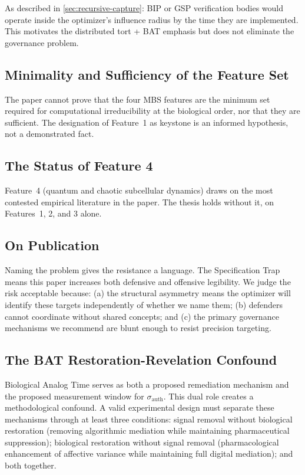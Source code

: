 \documentclass[11pt, a4paper]{article}
\theoremstyle{remark}
\begin{document}
As described in \cref{sec:recursive-capture}: BIP or GSP verification bodies would operate inside the optimizer's influence radius by the time they are implemented. This motivates the distributed tort + BAT emphasis but does not eliminate the governance problem.

\subsection{Minimality and Sufficiency of the Feature Set}\label{sec:lim-minimality}

The paper cannot prove that the four MBS features are the minimum set required for computational irreducibility at the biological order, nor that they are sufficient. The designation of Feature~1 as keystone is an informed hypothesis, not a demonstrated fact.

\subsection{The Status of Feature 4}\label{sec:lim-feature4}

Feature~4 (quantum and chaotic subcellular dynamics) draws on the most contested empirical literature in the paper. The thesis holds without it, on Features~1, 2, and 3 alone.

\subsection{On Publication}\label{sec:lim-publication}

Naming the problem gives the resistance a language. The Specification Trap means this paper increases both defensive and offensive legibility. We judge the risk acceptable because: (a) the structural asymmetry means the optimizer will identify these targets independently of whether we name them; (b) defenders cannot coordinate without shared concepts; and (c) the primary governance mechanisms we recommend are blunt enough to resist precision targeting.

\subsection{The BAT Restoration-Revelation Confound}\label{sec:lim-bat-confound}

Biological Analog Time serves as both a proposed remediation mechanism and the proposed measurement window for $\sigma_{\text{auth}}$. This dual role creates a methodological confound. A valid experimental design must separate these mechanisms through at least three conditions: signal removal without biological restoration (removing algorithmic mediation while maintaining pharmaceutical suppression); biological restoration without signal removal (pharmacological enhancement of affective variance while maintaining full digital mediation); and both together.
\end{document}
